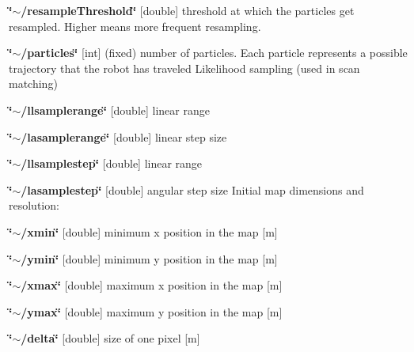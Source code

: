 \begin{DoxyItemize}
\item {\bfseries \char`\"{}$\sim$/resample\+Threshold\char`\"{}} {\bfseries }\mbox{[}double\mbox{]} threshold at which the particles get resampled. Higher means more frequent resampling.
\item {\bfseries \char`\"{}$\sim$/particles\char`\"{}} {\bfseries }\mbox{[}int\mbox{]} (fixed) number of particles. Each particle represents a possible trajectory that the robot has traveled Likelihood sampling (used in scan matching)
\item {\bfseries \char`\"{}$\sim$/llsamplerange\char`\"{}} {\bfseries }\mbox{[}double\mbox{]} linear range
\item {\bfseries \char`\"{}$\sim$/lasamplerange\char`\"{}} {\bfseries }\mbox{[}double\mbox{]} linear step size
\item {\bfseries \char`\"{}$\sim$/llsamplestep\char`\"{}} {\bfseries }\mbox{[}double\mbox{]} linear range
\item {\bfseries \char`\"{}$\sim$/lasamplestep\char`\"{}} {\bfseries }\mbox{[}double\mbox{]} angular step size Initial map dimensions and resolution\+:
\item {\bfseries \char`\"{}$\sim$/xmin\char`\"{}} {\bfseries }\mbox{[}double\mbox{]} minimum x position in the map \mbox{[}m\mbox{]}
\item {\bfseries \char`\"{}$\sim$/ymin\char`\"{}} {\bfseries }\mbox{[}double\mbox{]} minimum y position in the map \mbox{[}m\mbox{]}
\item {\bfseries \char`\"{}$\sim$/xmax\char`\"{}} {\bfseries }\mbox{[}double\mbox{]} maximum x position in the map \mbox{[}m\mbox{]}
\item {\bfseries \char`\"{}$\sim$/ymax\char`\"{}} {\bfseries }\mbox{[}double\mbox{]} maximum y position in the map \mbox{[}m\mbox{]}
\item {\bfseries \char`\"{}$\sim$/delta\char`\"{}} {\bfseries }\mbox{[}double\mbox{]} size of one pixel \mbox{[}m\mbox{]} 
\end{DoxyItemize}